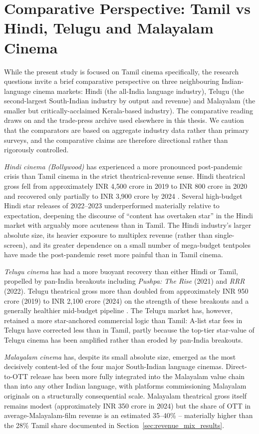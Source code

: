 \section{Comparative Perspective: Tamil vs Hindi, Telugu and Malayalam Cinema}
\label{sec:comparative}

While the present study is focused on Tamil cinema specifically, the
research questions invite a brief comparative perspective on three
neighbouring Indian-language cinema markets: Hindi (the all-India
language industry), Telugu (the second-largest South-Indian industry
by output and revenue) and Malayalam (the smaller but
critically-acclaimed Kerala-based industry).  The comparative reading
draws on \citet{ficciey2024,kpmg2023,ormax2024} and the trade-press
archive used elsewhere in this thesis.  We caution that the
comparators are based on aggregate industry data rather than primary
surveys, and the comparative claims are therefore directional rather
than rigorously controlled.

\textit{Hindi cinema (Bollywood)} has experienced a more pronounced
post-pandemic crisis than Tamil cinema in the strict theatrical-revenue
sense.  Hindi theatrical gross fell from approximately INR 4{,}500
crore in 2019 to INR 800 crore in 2020 and recovered only partially
to INR 3{,}900 crore by 2024 \citep{ficciey2024,ormax2024}.  Several
high-budget Hindi star releases of 2022--2023 underperformed
materially relative to expectation, deepening the discourse of
``content has overtaken star'' in the Hindi market with arguably more
acuteness than in Tamil.  The Hindi industry's larger absolute size,
its heavier exposure to multiplex revenue (rather than single-screen),
and its greater dependence on a small number of mega-budget tentpoles
have made the post-pandemic reset more painful than in Tamil cinema.

\textit{Telugu cinema} has had a more buoyant recovery than either
Hindi or Tamil, propelled by pan-India breakouts including
\emph{Pushpa: The Rise} (2021) and \emph{RRR} (2022).  Telugu
theatrical gross more than doubled from approximately INR 950 crore
(2019) to INR 2{,}100 crore (2024) on the strength of these
breakouts and a generally healthier mid-budget pipeline
\citep{ficciey2024}.  The Telugu market has, however, retained a
more star-anchored commercial logic than Tamil: A-list star fees in
Telugu have corrected less than in Tamil, partly because the
top-tier star-value of Telugu cinema has been amplified rather than
eroded by pan-India breakouts.

\textit{Malayalam cinema} has, despite its small absolute size,
emerged as the most decisively content-led of the four major
South-Indian language cinemas.  Direct-to-OTT release has been more
fully integrated into the Malayalam value chain than into any other
Indian language, with platforms commissioning Malayalam originals
on a structurally consequential scale.  Malayalam theatrical gross
itself remains modest (approximately INR 350 crore in 2024) but the
share of OTT in average-Malayalam-film revenue is an estimated
35--40\% -- materially higher than the 28\% Tamil share documented
in Section~\ref{sec:revenue_mix_results}.

